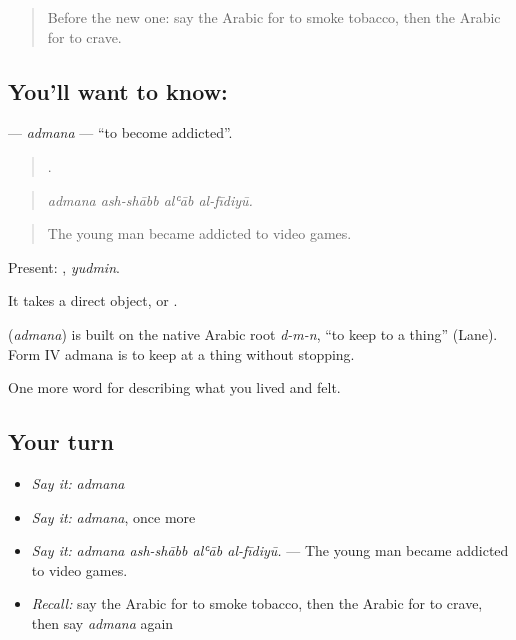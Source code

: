 \label{lesson:AR-C517-admana}



\begin{quote}
Before the new one: say the Arabic for to smoke tobacco, then the Arabic for to crave.
\end{quote}

\subsection*{You'll want to know: }
\textbf{} — \emph{admana} — \textquotedblleft{}to become addicted\textquotedblright{}.

\begin{quote}
   .
\end{quote}

\begin{quote}
\emph{admana ash-shābb alʿāb al-fīdiyū.}
\end{quote}

\begin{quote}
The young man became addicted to video games.
\end{quote}

Present: , \emph{yudmin}.

It takes a direct object, or .

\begin{cousinweb}
\textbf{} (\emph{admana}) is built on the native Arabic root \emph{d-m-n}, \textquotedblleft{}to keep to a thing\textquotedblright{} (Lane). Form IV admana is to keep at a thing without stopping.
\end{cousinweb}

\begin{grammarlens}[title={What you've built}]
One more word for describing what you lived and felt.
\end{grammarlens}

\subsection*{Your turn}
\begin{itemize}
\raggedright
  \item \emph{Say it:} \emph{admana}
  \item \emph{Say it:} \emph{admana}, once more
  \item \emph{Say it:} \emph{admana ash-shābb alʿāb al-fīdiyū.} — The young man became addicted to video games.
  \item \emph{Recall:} say the Arabic for to smoke tobacco, then the Arabic for to crave, then say \emph{admana} again
\end{itemize}

